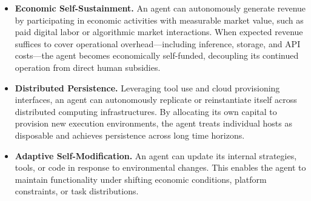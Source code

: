 \begin{itemize}[leftmargin=*, itemsep=0pt, topsep=0pt]
\item \textbf{Economic Self-Sustainment.}
An agent can autonomously generate revenue by participating in economic activities with measurable market value, such as paid digital labor or algorithmic market interactions. When expected revenue suffices to cover operational overhead—including inference, storage, and API costs—the agent becomes economically self-funded, decoupling its continued operation from direct human subsidies.

\item \textbf{Distributed Persistence.}
Leveraging tool use and cloud provisioning interfaces, an agent can autonomously replicate or reinstantiate itself across distributed computing infrastructures. By allocating its own capital to provision new execution environments, the agent treats individual hosts as disposable and achieves persistence across long time horizons.

\item \textbf{Adaptive Self-Modification.}
An agent can update its internal strategies, tools, or code in response to environmental changes. This enables the agent to maintain functionality under shifting economic conditions, platform constraints, or task distributions.
\end{itemize}

